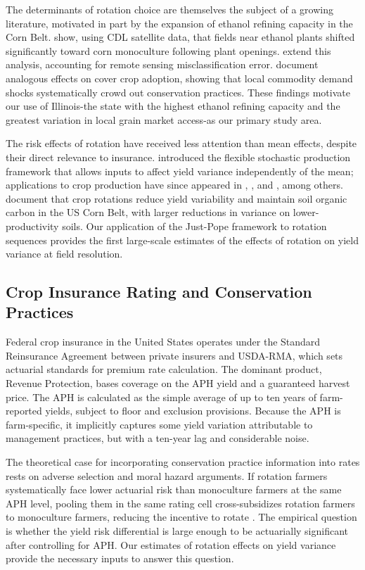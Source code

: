 \documentclass[12pt,letterpaper]{article}
\theoremstyle{remark}
\theoremstyle{remark}
\theoremstyle{plain}
\theoremstyle{definition}
\begin{document}
The determinants of rotation choice are themselves the subject of a growing literature, motivated in part by the expansion of ethanol refining capacity in the Corn Belt. \citet{pates2021} show, using CDL satellite data, that fields near ethanol plants shifted significantly toward corn monoculture following plant openings. \citet{Pates2025} extend this analysis, accounting for remote sensing misclassification error. \citet{cheu2025} document analogous effects on cover crop adoption, showing that local commodity demand shocks systematically crowd out conservation practices. These findings motivate our use of Illinois-the state with the highest ethanol refining capacity and the greatest variation in local grain market access-as our primary study area.
 
The risk effects of rotation have received less attention than mean effects, despite their direct relevance to insurance. \citet{Just1979} introduced the flexible stochastic production framework that allows inputs to affect yield variance independently of the mean; applications to crop production have since appeared in \citet{antle1983}, \citet{shi2013}, and \citet{li2021}, among
others. \citet{wu2025} document that crop rotations reduce yield variability and maintain soil organic carbon in the US Corn Belt, with larger reductions in variance on lower-productivity soils. Our application of the Just-Pope framework to rotation sequences provides the first large-scale estimates of the effects of rotation on yield variance at field resolution.

\subsection{\label{subsec:insurance_rating} Crop Insurance Rating and Conservation Practices}

Federal crop insurance in the United States operates under the Standard Reinsurance Agreement between private insurers and USDA-RMA, which sets actuarial standards for premium rate calculation. The dominant product, Revenue Protection, bases coverage on the APH yield and a guaranteed harvest price. The APH is calculated as the simple average of up to ten years of farm-reported yields, subject to floor and exclusion provisions. Because the APH is farm-specific, it implicitly captures some yield variation attributable to management practices, but with a ten-year lag and considerable noise.

The theoretical case for incorporating conservation practice information into rates rests on adverse selection and moral hazard arguments. If rotation farmers systematically face lower actuarial risk than monoculture farmers at the same APH level, pooling them in the same rating cell cross-subsidizes rotation farmers to monoculture farmers, reducing the incentive to rotate \citep{Ramaswami1993, Babcock1996}. The empirical question is whether the yield risk differential is large enough to be actuarially significant after controlling for APH. Our estimates of rotation effects on yield variance provide the necessary inputs to answer this question.
\end{document}
